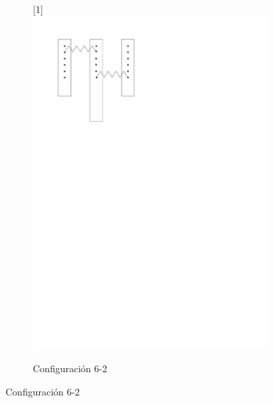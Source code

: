 \begin{figure}[htbp!]
\begin{subfigure}[b]{0.3\textwidth}
		\scalebox{-1}[1]{\includegraphics[width=\linewidth]{./Figures/26.pdf}}
		\caption{Configuración 6-2}
		\label{fig:conf-2-6}
	\end{subfigure}

	\vspace{0.5cm}


\end{figure}
